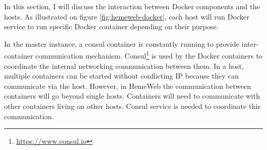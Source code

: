 \vspace{1cm}

\noindent%
\begin{minipage}{\linewidth}%
\label{fig:hemeweb-docker}%
\end{minipage}

\vspace{1cm}

In this section, I will discuss the interaction between Docker components and the hosts. As illustrated on figure \ref{fig:hemeweb-docker}, each host will run Docker service to run specific Docker container depending on their purpose.

In the master instance, a consul container is constantly running to provide inter-container communication mechanism. Consul\footnote{\url{https://www.consul.io}} is used by the Docker containers to coordinate the internal networking communication between them. In a host, multiple containers can be started without conflicting IP because they can communicate via the host. However, in HemeWeb the communication between containers will go beyond single hosts. Containers will need to communicate with other containers living on other hosts. Consul service is needed to coordinate this communication.

